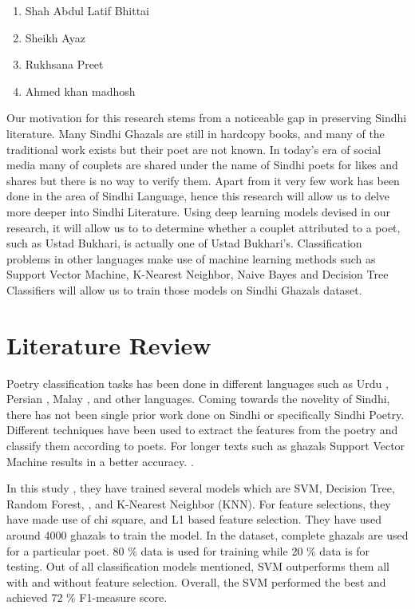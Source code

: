 \documentclass[conference]{IEEEtran}
\begin{document}
\begin{enumerate}
    \item Shah Abdul Latif Bhittai
    \item Sheikh Ayaz
    \item Rukhsana Preet
    \item Ahmed khan madhosh
\end{enumerate}

\par

Our motivation for this research stems from a noticeable gap in preserving Sindhi literature. Many Sindhi Ghazals are still in hardcopy books, and many of the traditional work exists but their poet are not known. In today's era of social media many of couplets are shared under the name of Sindhi poets for likes and shares but there is no way to verify them. Apart from it very few work has been done in the area of Sindhi Language, hence this research will allow us to delve more deeper into Sindhi Literature. Using deep learning models devised in our research, it will allow us to to determine whether a couplet attributed to a poet, such as Ustad Bukhari, is actually one of Ustad Bukhari's. Classification problems in other languages make use of machine learning methods such as Support Vector Machine, K-Nearest Neighbor, Naive Bayes and Decision Tree Classifiers will allow us to train those models on Sindhi Ghazals dataset. 

\section{Literature Review}
Poetry classification tasks has been done in different languages such as Urdu \cite{b3} , Persian \cite{b1}, Malay \cite{b2}, and other languages. Coming towards the novelity of Sindhi, there has not been single prior work done on Sindhi or specifically Sindhi Poetry. Different techniques have been used to extract the features from the poetry and classify them according to poets. For longer texts such as ghazals Support Vector Machine results in a better accuracy. \cite{b3}.


\par
In this study \cite{b3}, they have trained several models which are SVM, Decision Tree, Random Forest, , and K-Nearest Neighbor (KNN). For feature selections, they have made use of chi square, and L1 based feature selection. They have used around 4000 ghazals to train the model. In the dataset, complete ghazals are used for a particular poet. 80 \% data is used for training while 20 \% data is for testing. Out of all classification models mentioned, SVM outperforms them all with and without feature selection. Overall, the SVM performed the best and achieved 72 \% F1-measure score.
\end{document}
